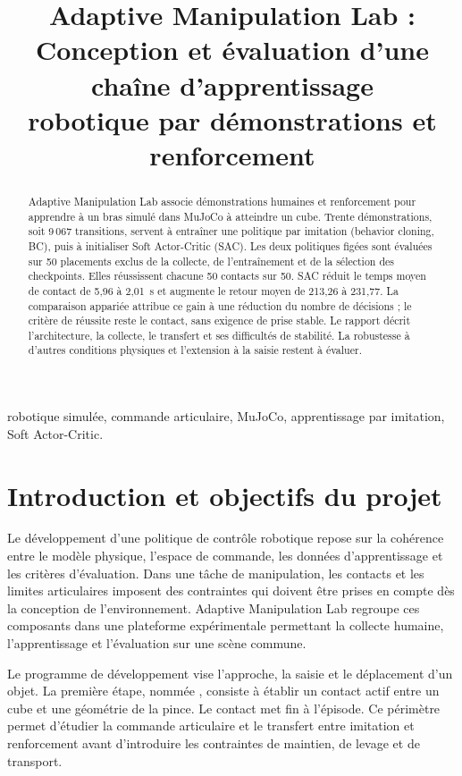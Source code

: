 \documentclass[conference,a4paper]{IEEEtran}
\title{Adaptive Manipulation Lab :\protect\\
Conception et évaluation d'une chaîne d'apprentissage\protect\\
robotique par démonstrations et renforcement}
\author{\IEEEauthorblockN{Louis Lejaille}
\IEEEauthorblockA{Rapport technique R\&D --- 9 octobre 2026\\
\href{mailto:louis.lejaille@epitech.eu}{louis.lejaille@epitech.eu}}}
\newcommand{\code}[1]{\texttt{\detokenize{#1}}}
\begin{document}
\maketitle

\begin{abstract}
Adaptive Manipulation Lab associe démonstrations humaines et renforcement pour apprendre à un bras simulé dans MuJoCo à atteindre un cube. Trente démonstrations, soit 9\,067 transitions, servent à entraîner une politique par imitation (behavior cloning, BC), puis à initialiser Soft Actor-Critic (SAC). Les deux politiques figées sont évaluées sur 50 placements exclus de la collecte, de l'entraînement et de la sélection des checkpoints. Elles réussissent chacune 50 contacts sur 50. SAC réduit le temps moyen de contact de 5,96 à 2,01~s et augmente le retour moyen de 213,26 à 231,77. La comparaison appariée attribue ce gain à une réduction du nombre de décisions ; le critère de réussite reste le contact, sans exigence de prise stable. Le rapport décrit l'architecture, la collecte, le transfert et ses difficultés de stabilité. La robustesse à d'autres conditions physiques et l'extension à la saisie restent à évaluer.
\end{abstract}

\begin{IEEEkeywords}
robotique simulée, commande articulaire, MuJoCo, apprentissage par imitation, Soft Actor-Critic.
\end{IEEEkeywords}

\section{Introduction et objectifs du projet}
Le développement d'une politique de contrôle robotique repose sur la cohérence entre le modèle physique, l'espace de commande, les données d'apprentissage et les critères d'évaluation. Dans une tâche de manipulation, les contacts et les limites articulaires imposent des contraintes qui doivent être prises en compte dès la conception de l'environnement. Adaptive Manipulation Lab regroupe ces composants dans une plateforme expérimentale permettant la collecte humaine, l'apprentissage et l'évaluation sur une scène commune.

Le programme de développement vise l'approche, la saisie et le déplacement d'un objet. La première étape, nommée \code{reach}, consiste à établir un contact actif entre un cube et une géométrie de la pince. Le contact met fin à l'épisode. Ce périmètre permet d'étudier la commande articulaire et le transfert entre imitation et renforcement avant d'introduire les contraintes de maintien, de levage et de transport.
\end{document}
